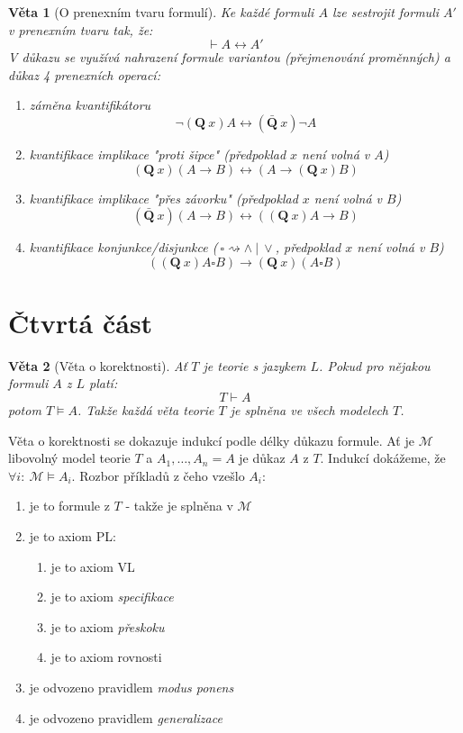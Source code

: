 \documentclass[a4paper]{article}      %
\newtheorem{theorem}{Věta}[section]
\newenvironment{proof}[1][Důkaz]{\begin{trivlist}
\item[\hskip \labelsep {\bfseries #1}]}{\end{trivlist}}
\begin{document}
\begin{theorem}[O prenexním tvaru formulí]
Ke každé formuli $A$ lze sestrojit formuli $A'$ v prenexním tvaru tak, že:
\[
\vdash A \leftrightarrow A'
\]
V důkazu se využívá nahrazení formule variantou (přejmenování proměnných) a důkaz 4 prenexních operací:
\begin{enumerate}
\item záměna kvantifikátoru
\[
\neg (\mathbf{Q}\ x)A \leftrightarrow (\mathbf{\bar{Q}}\ x)\neg A
\] 
\item kvantifikace implikace "proti šipce" (předpoklad $x$ není volná v $A$)
\[
(\mathbf{Q}\ x)(A \rightarrow B) \leftrightarrow (A \rightarrow (\mathbf{Q}\ x)B)
\]
\item kvantifikace implikace "přes závorku" (předpoklad $x$ není volná v $B$)
\[
(\mathbf{\bar{Q}}\ x)(A \rightarrow B) \leftrightarrow ((\mathbf{Q}\ x)A \rightarrow B)
\]
\item kvantifikace konjunkce/disjunkce ($\ \square \rightsquigarrow \wedge\ |\ \vee$, předpoklad $x$ není volná v $B$) 
\[
((\mathbf{Q}\ x)A \square B) \rightarrow (\mathbf{Q}\ x)(A \square B)
\]
\end{enumerate}
\end{theorem}

\section{Čtvrtá část}

\begin{theorem}[Věta o korektnosti]
Ať $T$ je teorie s jazykem $L$. Pokud pro nějakou formuli $A$ z $L$ platí:
\[
T \vdash A
\]
potom $T \models A$. Takže každá věta teorie $T$ je splněna ve všech modelech $T$.
\end{theorem}

\begin{proof}
Věta o korektnosti se dokazuje indukcí podle délky důkazu formule.
Ať je $\mathcal{M}$ libovolný model teorie $T$ a $A_1,\ldots,A_n = A$ je důkaz $A$ z $T$.
Indukcí dokážeme, že $\forall i:\ \mathcal{M} \vDash A_i$. Rozbor příkladů z čeho vzešlo $A_i$:
\begin{enumerate}
\item je to formule z $T$ - takže je splněna v $\mathcal{M}$
\item je to axiom PL:
	\begin{enumerate}
	\item je to axiom VL
	\item je to axiom \emph{specifikace}
	\item je to axiom \emph{přeskoku}
	\item je to axiom rovnosti
	\end{enumerate}
\item je odvozeno pravidlem \emph{modus ponens}
\item je odvozeno pravidlem \emph{generalizace}
\end{enumerate}
\end{proof}
\end{document}
